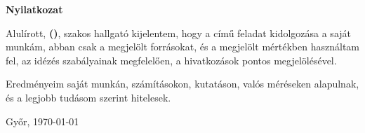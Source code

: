 \begin{center}
\large
\textbf{Nyilatkozat}\\
\end{center}

\noindent
Alulírott, \textbf{\szerzoVezeteknev{} \szerzoKeresztnev{} (\szerzoNeptun)}, \szak{} szakos hallgató kijelentem, hogy a \textit{\cim} című \MakeLowercase{\doktipus{}} feladat kidolgozása a saját munkám, abban csak a megjelölt forrásokat, és a megjelölt mértékben használtam fel, az idézés szabályainak megfelelően, a hivatkozások pontos megjelölésével.

\setlength\parskip{\baselineskip}

\noindent
Eredményeim saját munkán, számításokon, kutatáson, valós méréseken alapulnak, és a legjobb tudásom szerint hitelesek.

\vspace*{24pt}
\begin{multicols}{2}
	\noindent
	Győr, \today

	\columnbreak
	\noindent
	\vspace{-8mm}
	\\
	\makebox[7cm][c]{\rule{6cm}{.4pt}}\\
	\makebox[7cm][c]{\emph{\szerzoVezeteknev{} \szerzoKeresztnev}}\\
\end{multicols}

\thispagestyle{empty}

\vfill
\clearpage
\thispagestyle{empty} %

\selectthesislanguage
